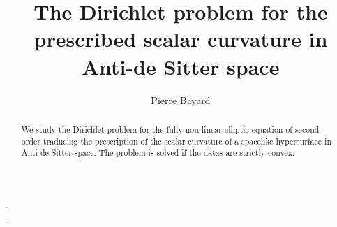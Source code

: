 \documentclass[10pt,reqno,oneside]{amsart}
\theoremstyle{definition}
\theoremstyle{remark}
\begin{document}
\title{The Dirichlet problem for the prescribed scalar curvature in Anti-de Sitter space}

\author{Pierre Bayard}

\address[P.~B.]{Facultad de Ciencias, Universidad Nacional Aut\'onoma de M\'exico
\\Av. Universidad 3000, Circuito Exterior S/N
\\Delegaci\'on Coyoac\'an, C.P. 04510, Ciudad Universitaria, CDMX, M\'exico}

\maketitle

\begin{abstract}
We study the Dirichlet problem for the fully non-linear elliptic equation of second order traducing the prescription of the scalar curvature of a spacelike hypersurface in Anti-de Sitter space. The problem is solved if the datas are strictly convex.
\end{abstract}

\vspace{1cm}

.
\\.

\date{}
\maketitle{}

\end{document}
